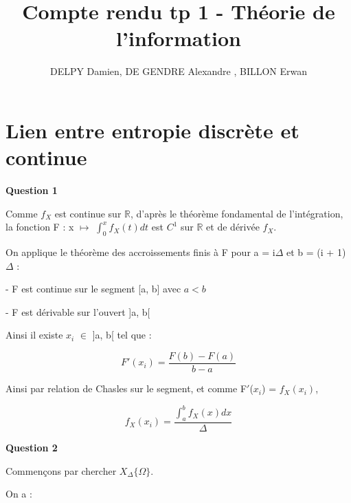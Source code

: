 \documentclass{article}
\begin{document}
\title{Compte rendu tp 1 - Théorie de l'information}
\author{DELPY Damien, DE GENDRE Alexandre , BILLON Erwan}
\maketitle

\pagestyle{plain}


\newpage
\section{Lien entre entropie discrète et continue}
	
\vspace{2\baselineskip}

	\textbf{Question 1}

\vspace{2\baselineskip}

Comme $f_X$ est continue sur $\mathbb{R}$, d'après le théorème fondamental de l'intégration, la fonction
F : x $\mapsto$ $\int_0^{x} f_X(t)dt$ est $C^1$ sur $\mathbb{R}$ et de dérivée $f_X$.

\vspace{2\baselineskip}

On applique le théorème des accroissements finis à F pour a = i$\Delta$ et b = (i + 1)$\Delta$ :

- F est continue sur le segment [a, b] avec $a < b$

- F est dérivable sur l'ouvert ]a, b[

Ainsi il existe $x_i$ $\in$ ]a, b[ tel que : 

$$ F'(x_i) = \frac{F(b) - F(a)}{b - a} $$

\vspace{2\baselineskip}

Ainsi par relation de Chasles sur le segment, et comme F$'$($x_i$) = $f_X(x_i)$,

$$ f_X(x_i) = \frac{\int_{a}^{b} f_X(x)dx}{\Delta} $$

\vspace{2\baselineskip}

	\textbf{Question 2}

\vspace{2\baselineskip}

Commençons par chercher $X_{\Delta}\{\Omega\}$.

On a : 

\vspace{2\baselineskip}
\end{document}
